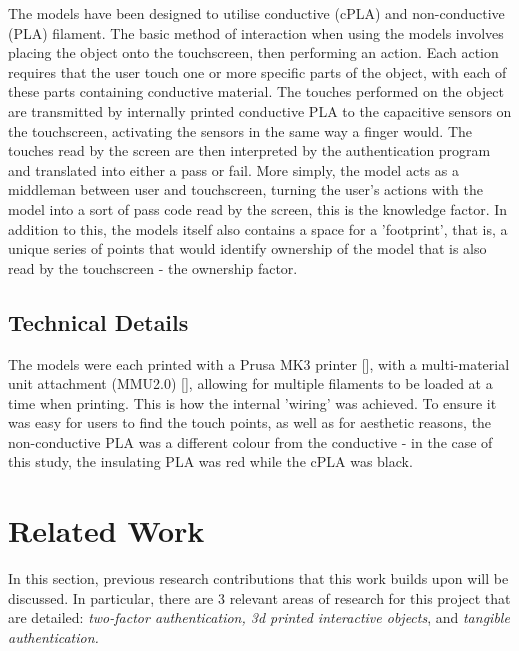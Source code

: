 \documentclass{l4proj}
\begin{document}
The models have been designed to utilise conductive (cPLA) and non-conductive (PLA) filament. The basic method of interaction when using the models involves placing the object onto the touchscreen, then performing an action. Each action requires that the user touch one or more specific parts of the object, with each of these parts containing conductive material. The touches performed on the object are transmitted by internally printed conductive PLA to the capacitive sensors on the touchscreen, activating the sensors in the same way a finger would. The touches read by the screen are then interpreted by the authentication program and translated into either a pass or fail. More simply, the model acts as a middleman between user and touchscreen, turning the user's actions with the model into a sort of pass code read by the screen, this is the knowledge factor. In addition to this, the models itself also contains a space for a 'footprint', that is, a unique series of points that would identify ownership of the model that is also read by the touchscreen - the ownership factor.

\section{Technical Details}

The models were each printed with a Prusa MK3 printer [\cite{prusaprinter}], with a multi-material unit attachment (MMU2.0) [\cite{prusammu}], allowing for multiple filaments to be loaded at a time when printing. This is how the internal 'wiring' was achieved. To ensure it was easy for users to find the touch points, as well as for aesthetic reasons, the non-conductive PLA was a different colour from the conductive - in the case of this study, the insulating PLA was red while the cPLA was black.


\chapter{Related Work}

In this section, previous research contributions that this work builds upon will be discussed. In particular, there are 3 relevant areas of research for this project that are detailed: \textit{two-factor authentication, 3d printed interactive objects}, and \textit{tangible authentication.}
\end{document}
